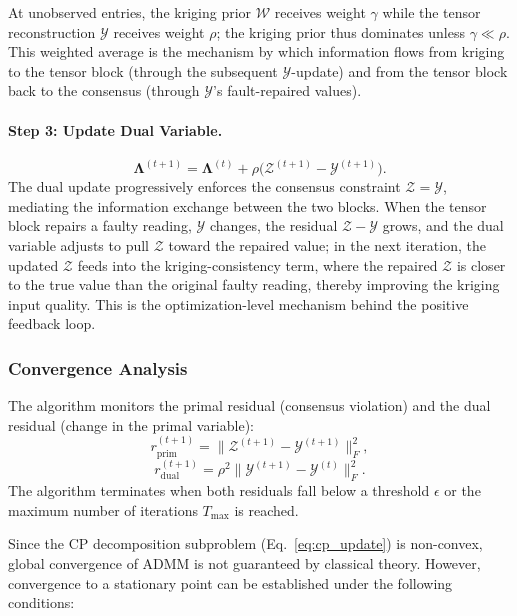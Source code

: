 \documentclass[journal]{IEEEtran}
\newcommand{\Zcal}{\mathcal{Z}}
\newcommand{\Ycal}{\mathcal{Y}}
\newcommand{\Wcal}{\mathcal{W}}
\begin{document}
At unobserved entries, the kriging prior $\Wcal$ receives weight $\gamma$ while the tensor reconstruction $\Ycal$ receives weight $\rho$; the kriging prior thus dominates unless $\gamma \ll \rho$. This weighted average is the mechanism by which information flows from kriging to the tensor block (through the subsequent $\Ycal$-update) and from the tensor block back to the consensus (through $\Ycal$'s fault-repaired values).

\paragraph{Step 3: Update Dual Variable.}
\begin{equation}\label{eq:dual}
\boldsymbol{\Lambda}^{(t+1)} = \boldsymbol{\Lambda}^{(t)} + \rho\bigl(\Zcal^{(t+1)} - \Ycal^{(t+1)}\bigr).
\end{equation}
The dual update progressively enforces the consensus constraint $\Zcal = \Ycal$, mediating the information exchange between the two blocks. When the tensor block repairs a faulty reading, $\Ycal$ changes, the residual $\Zcal - \Ycal$ grows, and the dual variable adjusts to pull $\Zcal$ toward the repaired value; in the next iteration, the updated $\Zcal$ feeds into the kriging-consistency term, where the repaired $\Zcal$ is closer to the true value than the original faulty reading, thereby improving the kriging input quality. This is the optimization-level mechanism behind the positive feedback loop.

\subsubsection{Convergence Analysis}\label{sec:convergence}

The algorithm monitors the primal residual (consensus violation) and the dual residual (change in the primal variable):
\begin{equation}\label{eq:r_prim}
r_{\mathrm{prim}}^{(t+1)} = \bigl\|\Zcal^{(t+1)} - \Ycal^{(t+1)}\bigr\|_{F}^{2},
\end{equation}
\begin{equation}\label{eq:r_dual}
r_{\mathrm{dual}}^{(t+1)} = \rho^2\bigl\|\Ycal^{(t+1)} - \Ycal^{(t)}\bigr\|_{F}^{2}.
\end{equation}
The algorithm terminates when both residuals fall below a threshold $\epsilon$ or the maximum number of iterations $T_{\max}$ is reached.

Since the CP decomposition subproblem (Eq.~\eqref{eq:cp_update}) is non-convex, global convergence of ADMM is not guaranteed by classical theory. However, convergence to a stationary point can be established under the following conditions:
\end{document}
